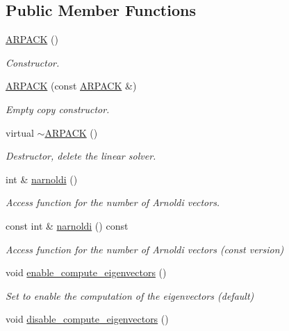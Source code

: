 \subsection*{Public Member Functions}
\begin{DoxyCompactItemize}
\item 
\hyperlink{classoomph_1_1ARPACK_aef258a621d2ba000382d8e0cc9118e8d}{A\+R\+P\+A\+CK} ()
\begin{DoxyCompactList}\small\item\em Constructor. \end{DoxyCompactList}\item 
\hyperlink{classoomph_1_1ARPACK_a0461252a3602e71c52400b5994cb9efa}{A\+R\+P\+A\+CK} (const \hyperlink{classoomph_1_1ARPACK}{A\+R\+P\+A\+CK} \&)
\begin{DoxyCompactList}\small\item\em Empty copy constructor. \end{DoxyCompactList}\item 
virtual \hyperlink{classoomph_1_1ARPACK_a67b999708483787f4211a15feb71ed11}{$\sim$\+A\+R\+P\+A\+CK} ()
\begin{DoxyCompactList}\small\item\em Destructor, delete the linear solver. \end{DoxyCompactList}\item 
int \& \hyperlink{classoomph_1_1ARPACK_a4e398ee962b8843668a76904b3302bb0}{narnoldi} ()
\begin{DoxyCompactList}\small\item\em Access function for the number of Arnoldi vectors. \end{DoxyCompactList}\item 
const int \& \hyperlink{classoomph_1_1ARPACK_a4b7b996589dfe4f61868be9ce381a41e}{narnoldi} () const
\begin{DoxyCompactList}\small\item\em Access function for the number of Arnoldi vectors (const version) \end{DoxyCompactList}\item 
void \hyperlink{classoomph_1_1ARPACK_a9945e2656f93850112f8836a585b32b0}{enable\+\_\+compute\+\_\+eigenvectors} ()
\begin{DoxyCompactList}\small\item\em Set to enable the computation of the eigenvectors (default) \end{DoxyCompactList}\item 
void \hyperlink{classoomph_1_1ARPACK_adfd771b9ef52ec5b0ee78918027679c0}{disable\+\_\+compute\+\_\+eigenvectors} ()

\end{DoxyCompactItemize}
